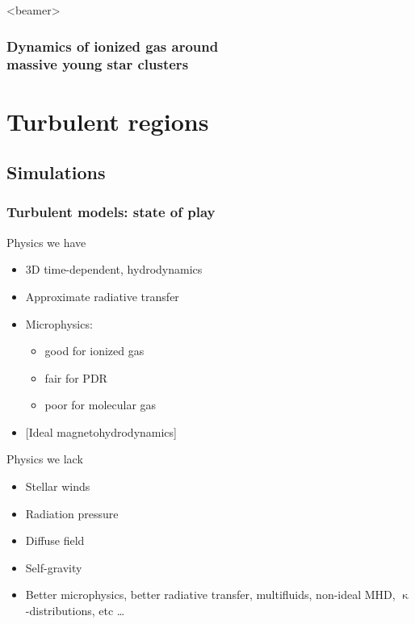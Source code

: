\documentclass[presentation]{beamer}
\begin{document}
\begin{frame}<beamer>
  \frametitle{Dynamics of ionized gas around\\ massive young star clusters}
  \tableofcontents[hidesubsections]
\end{frame}

\section{Turbulent \hii{} regions}
\subsection{Simulations}

\newlength\maxheight
\setlength\maxheight{0.8\textheight}
\newlength\moviewidth
\setlength{}
\newlength\movieheight


\begin{frame}[shrink=5]
\frametitle{Turbulent models: state of play}
\begin{block}{Physics we have}
  \begin{itemize}
  \item 3D time-dependent, hydrodynamics
  \item Approximate radiative transfer
  \item Microphysics:
    \begin{itemize}
    \item good for ionized gas
    \item fair for PDR
    \item poor for molecular gas
    \end{itemize}
  \item {}[Ideal magnetohydrodynamics]
  \end{itemize}
\end{block}
\begin{block}{Physics we lack}
  \begin{itemize}
  \item Stellar winds
  \item Radiation pressure
  \item Diffuse field
  \item Self-gravity
  \item{} 
    {\footnotesize Better microphysics, better radiative transfer,
    \scriptsize multifluids, non-ideal MHD, \tiny \(\upkappa\)-distributions, etc \dots}
  \end{itemize}
\end{block}
\end{frame}
\end{document}

